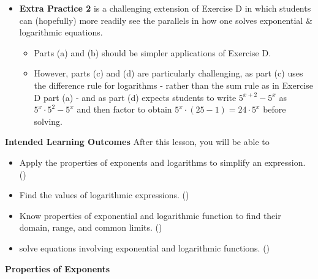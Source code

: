 \documentclass[10pt]{article}
\begin{document}
\begin{itemize}
\item {\bf\color{blue} Extra Practice 2} is a challenging extension of Exercise D in which students can (hopefully) more readily see the parallels in how one solves exponential \& logarithmic equations. 
    \begin{itemize}
    \item Parts (a) and (b) should be simpler applications of Exercise D. 
    \item However, parts (c) and (d) are particularly challenging, as part (c) uses the difference rule for logarithms - rather than the sum rule as in Exercise D part (a) - and as part (d) expects students to write $5^{x+2}-5^x$ as $5^{x}\cdot5^2 - 5^x$ and then factor to obtain $5^x\cdot(25-1)=24\cdot5^x$ before solving.
    \end{itemize}
\end{itemize}
\newpage

\textbf{Intended Learning Outcomes}
After this lesson, you will be able to 

\begin{itemize}
    \item Apply the properties of exponents and logarithms to simplify an expression. ()
    \item Find the values of logarithmic expressions. ()
    \item Know properties of exponential and logarithmic function to find their domain, range, and common limits. ()
    \item solve equations involving exponential and logarithmic functions. ()
\end{itemize}

\vspace{-0.5cm}

\hrulefill


{\bf Properties of Exponents}



\,\hfill
{}
\hfill
{}
\hfill
{}
\hfill
{}
\hfill
\,\\

\,\hfill\hfill
{}
\hfill
{}
\hfill
{}
\hfill\hfill\,


\end{document}

